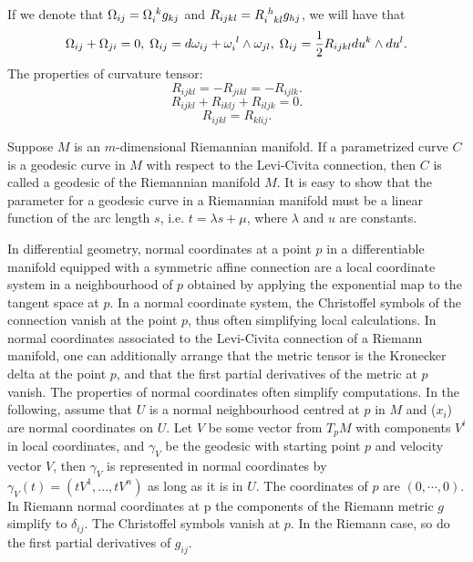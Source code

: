 \begin{newprop}
If we denote that $\Omega_{ij} = \tensor{\Omega}{_i^k}g_{kj}$ and $R_{ijkl} = \tensor{R}{_i^h_{kl}} g_{hj}$, we will have that
\[\Omega_{ij} + \Omega_{ji} = 0,\;\Omega_{ij} = d\omega_{ij} + \tensor{\omega}{_i^l} \wedge \omega_{jl},\;\Omega_{ij} = \frac{1}{2}R_{ijkl}du^k \wedge du^l.\]
The properties of curvature tensor:
\[R_{ijkl} = -R_{jikl} = -R_{ijlk}.\]
\[R_{ijkl}+R_{iklj}+R_{iljk}=0.\]
\[R_{ijkl} = R_{klij}.\]
\end{newprop}

\begin{newdef}[Geodesic]
Suppose $M$ is an $m$-dimensional Riemannian manifold. 
If a parametrized curve $C$ is a geodesic curve in $M$ with respect to the Levi-Civita connection, then $C$ is called a geodesic of the Riemannian manifold $M$.
It is easy to show that the parameter for a geodesic curve in a Riemannian manifold must be a linear function of the arc length $s$, i.e. $t = \lambda s + \mu$, where $\lambda$ and $u$ are constants.
\end{newdef}

\begin{newdef}
In differential geometry, normal coordinates at a point $p$ in a differentiable manifold equipped with a symmetric affine connection are a local coordinate system in a neighbourhood of $p$ obtained by applying the exponential map to the tangent space at $p$. In a normal coordinate system, the Christoffel symbols of the connection vanish at the point $p$, thus often simplifying local calculations. In normal coordinates associated to the Levi-Civita connection of a Riemann manifold, one can additionally arrange that the metric tensor is the Kronecker delta at the point $p$, and that the first partial derivatives of the metric at $p$ vanish.
The properties of normal coordinates often simplify computations. In the following, assume that $U$ is a normal neighbourhood centred at $p$ in $M$ and ($x_i$) are normal coordinates on $U$.
Let $V$ be some vector from $T_pM$ with components $V^i$ in local coordinates, and $\gamma_V$ be the geodesic with starting point $p$ and velocity vector $V$, then $\gamma_V$ is represented in normal coordinates by $\gamma _{V}(t)=(tV^{1},...,tV^{n})$ as long as it is in $U$.
The coordinates of $p$ are $(0, \cdots, 0)$.
In Riemann normal coordinates at p the components of the Riemann metric $g$ simplify to $\delta _{ij}$.
The Christoffel symbols vanish at $p$. In the Riemann case, so do the first partial derivatives of $g_{ij}$.
\end{newdef}

